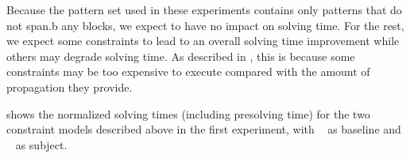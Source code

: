 Because the \gls{pattern set} used in these experiments contains only
\glspl{pattern} that do not \gls{span.b} any \glspl{block}, we expect
 to
have no impact on solving time.
%
For the rest, we expect some \glspl{constraint} to lead to an overall solving
time improvement while others may degrade solving time.
%
As described in , this is because some
\glspl{constraint} may be too expensive to execute compared with the amount of
\gls{propagation} they provide.

 shows the normalized
solving times (including \gls{presolving} time) for the two \glspl{constraint
  model} described above in the first experiment, with ~ as \gls{baseline} and
~ as \gls{subject}.
%
%
